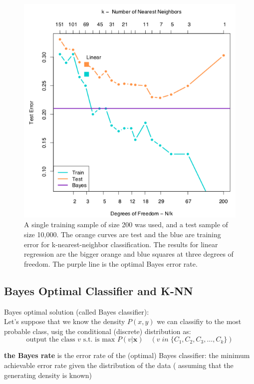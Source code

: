 \documentclass[../main.tex]{subfiles}
\begin{document}
\begin{figure}
    \centering
    \includegraphics[scale = 0.4]{lectures/3_K_nn/3_degree_of_freedom_plot.png}
    \caption{A single training sample of size 200 was used, and a test sample of size 10,000. The orange curves are test and the blue are training error for k-nearest-neighbor classification. The results for linear regression are the bigger orange and blue squares at three degrees of freedom. The purple line is the optimal Bayes error rate.}
    \label{fig:3_degree_of_freedom_plot}
\end{figure}
\subsection{Bayes Optimal Classifier and K-NN}
Bayes optimal solution (called Bayes classifier):\\

Let's suppose that we know the density $P(x,y)$ we can classifiy to the most probable class, usig the conditional (discrete) distribution as:
\[
    \text{output the class } v \text{ s.t. is max } P(v|\mathbf{x}) \quad (v \; in \; \{C_1, C_2, C_3, \dots, C_k\})
\]

\textbf{ the Bayes rate} is the error rate of the (optimal) Bayes classifier: the minimum achievable error rate given the distribution of the data ( assuming that the generating density is known)
\end{document}
